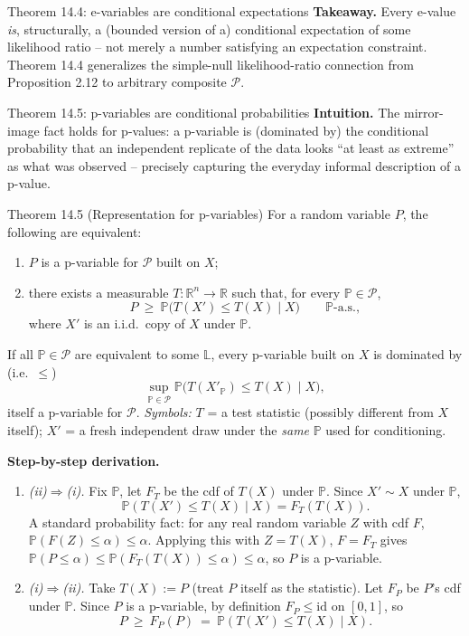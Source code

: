 \documentclass[aspectratio=169,10pt]{beamer}
\newcommand{\PP}{\mathbb{P}}
\newcommand{\RR}{\mathbb{R}}
\newcommand{\calP}{\mathcal{P}}
\begin{document}
\begin{frame}[allowframebreaks]{Theorem 14.4: e-variables are conditional expectations}
  \textbf{Takeaway.} Every e-value \emph{is}, structurally, a (bounded
  version of a) conditional expectation of some likelihood ratio -- not
  merely a number satisfying an expectation constraint. Theorem 14.4
  generalizes the simple-null likelihood-ratio connection from
  Proposition 2.12 to arbitrary composite $\calP$.
\end{frame}

\begin{frame}[allowframebreaks]{Theorem 14.5: p-variables are conditional probabilities}
  \textbf{Intuition.} The mirror-image fact holds for p-values: a
  p-variable is (dominated by) the conditional probability that an
  independent replicate of the data looks ``at least as extreme'' as what
  was observed -- precisely capturing the everyday informal description
  of a p-value.

  \begin{block}{Theorem 14.5 (Representation for p-variables)}
    For a random variable $P$, the following are equivalent:
    \begin{enumerate}
      \item[(i)] $P$ is a p-variable for $\calP$ built on $X$;
      \item[(ii)] there exists a measurable $T:\RR^n\to\RR$ such that, for
        every $\PP\in\calP$,
        \[
          P \ \geq\ \PP\big(T(X') \leq T(X) \mid X\big) \qquad \PP\text{-a.s.}, \tag{14.3}
        \]
        where $X'$ is an i.i.d.\ copy of $X$ under $\PP$.
    \end{enumerate}
    If all $\PP\in\calP$ are equivalent to some $\mathbb{L}$, every
    p-variable built on $X$ is dominated by (i.e.\ $\leq$)
    \[
      \sup_{\PP\in\calP} \PP\big(T(X'_{\PP}) \leq T(X) \mid X\big),
    \]
    itself a p-variable for $\calP$.
    \emph{Symbols:} $T$ = a test statistic (possibly different from $X$
    itself); $X'$ = a fresh independent draw under the \emph{same} $\PP$
    used for conditioning.
  \end{block}

  \framebreak

  \textbf{Step-by-step derivation.}
  \begin{enumerate}
    \item \emph{(ii)$\Rightarrow$(i).} Fix $\PP$, let $F_T$ be the cdf of
      $T(X)$ under $\PP$. Since $X'\sim X$ under $\PP$,
      \[
        \PP(T(X')\leq T(X)\mid X) = F_T(T(X)).
      \]
      A standard probability fact: for any real random variable $Z$ with
      cdf $F$, $\PP(F(Z) \leq \alpha) \leq \alpha$. Applying this with
      $Z=T(X)$, $F=F_T$ gives $\PP(P\leq\alpha)\leq \PP(F_T(T(X))\leq\alpha)\leq\alpha$,
      so $P$ is a p-variable.
    \item \emph{(i)$\Rightarrow$(ii).} Take $T(X) := P$ (treat $P$ itself
      as the statistic). Let $F_P$ be $P$'s cdf under $\PP$. Since $P$ is
      a p-variable, by definition $F_P \leq \mathrm{id}$ on $[0,1]$, so
      \[
        P \ \geq\ F_P(P) \ =\ \PP(T(X')\leq T(X) \mid X).
      \]
  \end{enumerate}


\end{frame}
\end{document}
